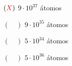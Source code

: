 \documentclass[a4paper, 12pt]{article}
\newcommand{\red}[1]{\textcolor{red}{#1}}
\begin{document}
\begin{flushleft}
\begin{itemize}
\begin{itemize}
{\begin{itemize}
\begin{equation*}
                                \end{equation*}
                        \end{itemize}}
                        \begin{itemize}
                            \item[$(\red{X})$] $9 \cdot 10^{37}$ átomos
                            \item[$(\quad)$] $9 \cdot 10^{35}$ átomos
                            \item[$(\quad)$] $5 \cdot 10^{34}$ átomos
                            \item[$(\quad)$] $5 \cdot 10^{36}$ átomos
                        \end{itemize}
                \end{itemize}
            

\end{itemize}
\end{flushleft}
\end{document}
